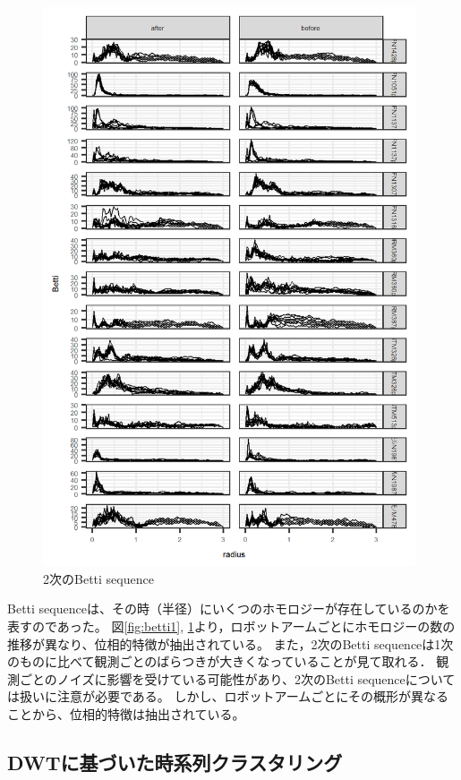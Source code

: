 \documentclass{jarticle}
\begin{document}
\begin{figure}[htbp]
\begin{center}
	\includegraphics[width=11cm]{fig/betti_2.png}	
	\caption{2次のBetti sequence}\label{fig:betti2}
\end{center}
\end{figure}

Betti sequenceは、その時（半径）にいくつのホモロジーが存在しているのかを表すのであった。
図\ref{fig:betti1}, \ref{fig:betti2}より，ロボットアームごとにホモロジーの数の推移が異なり、位相的特徴が抽出されている。
また，2次のBetti sequenceは1次のものに比べて観測ごとのばらつきが大きくなっていることが見て取れる．
観測ごとのノイズに影響を受けている可能性があり、2次のBetti sequenceについては扱いに注意が必要である。
しかし、ロボットアームごとにその概形が異なることから、位相的特徴は抽出されている。

\subsection{DWTに基づいた時系列クラスタリング}
\end{document}
